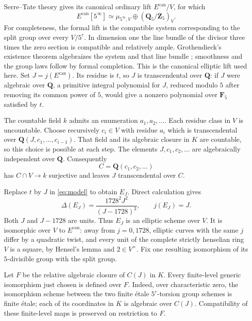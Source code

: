 \documentclass[11pt]{article}
\theoremstyle{remark}\newtheorem{remark}[theorem]{Remark}
\begin{document}
Serre--Tate theory gives its canonical ordinary lift $E^{\mathrm{can}}/V$, for which
\[
 E^{\mathrm{can}}[5^\infty]
 \simeq\mu_{5^\infty,V}\oplus(\mathbf Q_5/\mathbf Z_5)_V.
\]
For completeness, the formal lift is the compatible system corresponding to the split group over every $V/5^r$. In dimension one the line bundle of the divisor three times the zero section is compatible and relatively ample. Grothendieck's existence theorem algebraizes the system and that line bundle \citep[Tag~089A]{Stacks}; smoothness and the group laws follow by formal completion. This is the canonical elliptic lift used here. Set $J=j(E^{\mathrm{can}})$. Its residue is $t$, so $J$ is transcendental over $\mathbf Q$: if $J$ were algebraic over $\mathbf Q$, a primitive integral polynomial for $J$, reduced modulo $5$ after removing its common power of $5$, would give a nonzero polynomial over $\mathbf F_5$ satisfied by $t$.

The countable field $k$ admits an enumeration $a_1,a_2,\ldots$. Each residue class in $V$ is uncountable. Choose recursively $c_i\in V$ with residue $a_i$ which is transcendental over $\mathbf Q(J,c_1,\ldots,c_{i-1})$. That field and its algebraic closure in $K$ are countable, so this choice is possible at each step. The elements $J,c_1,c_2,\ldots$ are algebraically independent over $\mathbf Q$. Consequently
\[
 C=\mathbf Q(c_1,c_2,\ldots)
\]
has $C\cap V\to k$ surjective and leaves $J$ transcendental over $C$.

Replace $t$ by $J$ in \eqref{eq:model} to obtain $E_J$. Direct calculation gives
\begin{equation}\label{eq:invariants}
 \Delta(E_J)=\frac{1728^2J^2}{(J-1728)^3},
 \qquad j(E_J)=J.
\end{equation}
Both $J$ and $J-1728$ are units. Thus $E_J$ is an elliptic scheme over $V$. It is isomorphic over $V$ to $E^{\mathrm{can}}$: away from $j=0,1728$, elliptic curves with the same $j$ differ by a quadratic twist, and every unit of the complete strictly henselian ring $V$ is a square, by Hensel's lemma and $2\in V^\times$. Fix one resulting isomorphism of its $5$-divisible group with the split group.

Let $F$ be the relative algebraic closure of $C(J)$ in $K$. Every finite-level generic isomorphism just chosen is defined over $F$. Indeed, over characteristic zero, the isomorphism scheme between the two finite \'etale $5^r$-torsion group schemes is finite \'etale; each of its coordinates in $K$ is algebraic over $C(J)$. Compatibility of these finite-level maps is preserved on restriction to $F$.
\end{document}
